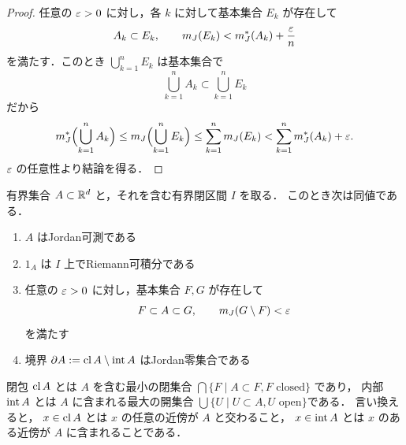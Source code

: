 \begin{proof}
任意の $\varepsilon>0$ に対し，各 $k$ に対して基本集合 $E_k$ が存在して
    \[
    A_k \subset E_k,
    \qquad
    m_J(E_k)<m_J^*(A_k)+\frac{\varepsilon}{n}
    \]
    を満たす．このとき $\bigcup_{k=1}^n E_k$ は基本集合で
    \[
    \bigcup_{k=1}^n A_k \subset \bigcup_{k=1}^n E_k
    \]
    だから
    \[
    m_J^*\Bigl(\bigcup_{k=1}^n A_k\Bigr)
    \le m_J\Bigl(\bigcup_{k=1}^n E_k\Bigr)
    \le \sum_{k=1}^n m_J(E_k)
    < \sum_{k=1}^n m_J^*(A_k)+\varepsilon.
    \]
    $\varepsilon$ の任意性より結論を得る．
\end{proof}

\begin{theorem}[Jordan可測の判定法]
有界集合 $A \subset \mathbb R^d$ と，それを含む有界閉区間 $I$ を取る．
このとき次は同値である．
\begin{enumerate}
    \item $A$ はJordan可測である
    \item $1_A$ は $I$ 上でRiemann可積分である
    \item 任意の $\varepsilon > 0$ に対し，基本集合 $F,G$ が存在して
    \[
    F \subset A \subset G,
    \qquad
    m_J(G \setminus F) < \varepsilon
    \]
    を満たす
    \item 境界 $\partial A := \operatorname{cl} A \setminus \operatorname{int} A$ はJordan零集合である
\end{enumerate}
\end{theorem}

\begin{remark}
閉包 $\operatorname{cl} A$ とは $A$ を含む最小の閉集合 $\bigcap \{ F \mid A \subset F, F \text { closed} \}$ であり，
内部 $\operatorname{int} A$ とは $A$ に含まれる最大の開集合 $\bigcup \{ U \mid U \subset A, U \text{ open} \}$である．
言い換えると，
$x \in \operatorname{cl} A$ とは $x$ の任意の近傍が $A$ と交わること，
$x \in \operatorname{int} A$ とは $x$ のある近傍が $A$ に含まれることである．
\end{remark}

